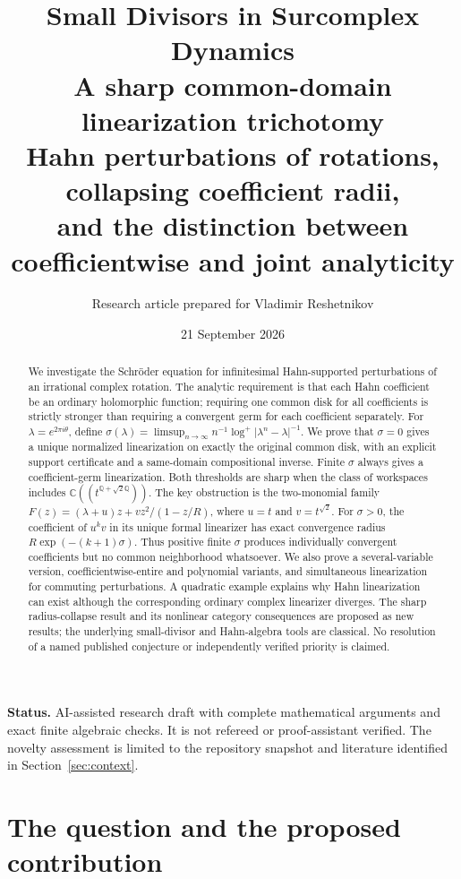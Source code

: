 \documentclass[11pt,a4paper]{article}
\title{\textbf{Small Divisors in Surcomplex Dynamics}\\[5pt]
\large A sharp common-domain linearization trichotomy\\
\normalsize Hahn perturbations of rotations, collapsing coefficient radii,\\
and the distinction between coefficientwise and joint analyticity}
\author{Research article prepared for Vladimir Reshetnikov}
\date{21 September 2026}
\numberwithin{equation}{section}
\theoremstyle{definition}
\theoremstyle{remark}
\newcommand{\C}{\mathbb C}
\newcommand{\Q}{\mathbb Q}
\newcommand{\abs}[1]{\lvert #1\rvert}
\begin{document}
\maketitle
\begin{abstract}
We investigate the Schr\"oder equation for infinitesimal Hahn-supported
perturbations of an irrational complex rotation. The analytic requirement is
that each Hahn coefficient be an ordinary holomorphic function; requiring one
common disk for all coefficients is strictly stronger than requiring a
convergent germ for each coefficient separately. For
$\lambda=e^{2\pi i\theta}$, define
$\sigma(\lambda)=\limsup_{n\to\infty}n^{-1}
\log^+\abs{\lambda^n-\lambda}^{-1}$.
We prove that $\sigma=0$ gives a unique normalized linearization on exactly
the original common disk, with an explicit support certificate and a
same-domain compositional inverse. Finite $\sigma$ always gives a
coefficient-germ linearization. Both thresholds are sharp when the class of
workspaces includes $\C((t^{\Q+\sqrt2\Q}))$.
The key obstruction is the two-monomial family
$F(z)=(\lambda+u)z+vz^2/(1-z/R)$, where $u=t$ and $v=t^{\sqrt2}$.
For $\sigma>0$, the coefficient of $u^kv$ in its unique formal linearizer has
exact convergence radius $R\exp(-(k+1)\sigma)$. Thus positive finite
$\sigma$ produces individually convergent coefficients but no common
neighborhood whatsoever. We also prove a several-variable version,
coefficientwise-entire and polynomial variants, and simultaneous
linearization for commuting perturbations. A quadratic example explains why
Hahn linearization can exist although the corresponding ordinary complex
linearizer diverges. The sharp radius-collapse result and its nonlinear
category consequences are proposed as new results; the underlying
small-divisor and Hahn-algebra tools are classical. No resolution of a named
published conjecture or independently verified priority is claimed.
\end{abstract}

\medskip
\noindent\textbf{Status.} AI-assisted research draft with complete mathematical
arguments and exact finite algebraic checks. It is not refereed or
proof-assistant verified. The novelty assessment is limited to the repository
snapshot and literature identified in Section~\ref{sec:context}.

\clearpage
\setcounter{tocdepth}{2}
\tableofcontents
\clearpage

\section{The question and the proposed contribution}\label{sec:intro}
\end{document}
